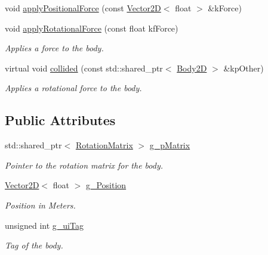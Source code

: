 \begin{DoxyCompactItemize}
void \hyperlink{class_body2_d_a87e9b9c0e07fe872cecc40c1afbf8480}{apply\+Positional\+Force} (const \hyperlink{class_vector2_d}{Vector2\+D}$<$ float $>$ \&k\+Force)
\item 
void \hyperlink{class_body2_d_a26336b3683b7cbda826bba54b8feca7d}{apply\+Rotational\+Force} (const float kf\+Force)
\begin{DoxyCompactList}\small\item\em Applies a force to the body. \end{DoxyCompactList}\item 
virtual void \hyperlink{class_body2_d_a55c37afe7eaa21a51cb309a2f52e0fcc}{collided} (const std\+::shared\+\_\+ptr$<$ \hyperlink{class_body2_d}{Body2\+D} $>$ \&kp\+Other)
\begin{DoxyCompactList}\small\item\em Applies a rotational force to the body. \end{DoxyCompactList}\end{DoxyCompactItemize}
\subsection*{Public Attributes}
\begin{DoxyCompactItemize}
\item 
\hypertarget{class_body2_d_a9bc86abec92a5f54009c44bddaaa5a72}{std\+::shared\+\_\+ptr$<$ \hyperlink{class_rotation_matrix}{Rotation\+Matrix} $>$ \hyperlink{class_body2_d_a9bc86abec92a5f54009c44bddaaa5a72}{g\+\_\+p\+Matrix}}\label{class_body2_d_a9bc86abec92a5f54009c44bddaaa5a72}

\begin{DoxyCompactList}\small\item\em Pointer to the rotation matrix for the body. \end{DoxyCompactList}\item 
\hypertarget{class_body2_d_a4ef190415b59cd68d0e4ce6cf7d1b70e}{\hyperlink{class_vector2_d}{Vector2\+D}$<$ float $>$ \hyperlink{class_body2_d_a4ef190415b59cd68d0e4ce6cf7d1b70e}{g\+\_\+\+Position}}\label{class_body2_d_a4ef190415b59cd68d0e4ce6cf7d1b70e}

\begin{DoxyCompactList}\small\item\em Position in Meters. \end{DoxyCompactList}\item 
\hypertarget{class_body2_d_aeaef63e80b0dab7c7e57e0c2fe8b4c2a}{unsigned int \hyperlink{class_body2_d_aeaef63e80b0dab7c7e57e0c2fe8b4c2a}{g\+\_\+ui\+Tag}}\label{class_body2_d_aeaef63e80b0dab7c7e57e0c2fe8b4c2a}

\begin{DoxyCompactList}\small\item\em Tag of the body. \end{DoxyCompactList}\end{DoxyCompactItemize}
